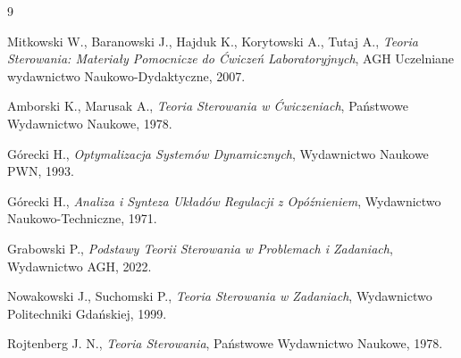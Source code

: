 \documentclass{article}
\begin{document}
\newpage
\begin{thebibliography}{9}

  Mitkowski W., Baranowski J., Hajduk K., Korytowski A., Tutaj A.,
  \emph{Teoria Sterowania: Materiały Pomocnicze do Ćwiczeń Laboratoryjnych},
  AGH Uczelniane wydawnictwo Naukowo-Dydaktyczne,
  2007.

  Amborski K., Marusak A.,
  \emph{Teoria Sterowania w Ćwiczeniach},
  Państwowe Wydawnictwo Naukowe,
  1978.

  Górecki H.,
  \emph{Optymalizacja Systemów Dynamicznych},
  Wydawnictwo Naukowe PWN,
  1993.

  Górecki H.,
  \emph{Analiza i Synteza Układów Regulacji z Opóźnieniem},
  Wydawnictwo Naukowo-Techniczne,
  1971.

  Grabowski P.,
  \emph{Podstawy Teorii Sterowania w Problemach i Zadaniach},
  Wydawnictwo AGH,
  2022.

  Nowakowski J., Suchomski P.,
  \emph{Teoria Sterowania w Zadaniach},
  Wydawnictwo Politechniki Gdańskiej,
  1999.

  Rojtenberg J. N.,
  \emph{Teoria Sterowania},
  Państwowe Wydawnictwo Naukowe,
  1978.

\end{thebibliography}
\end{document}
